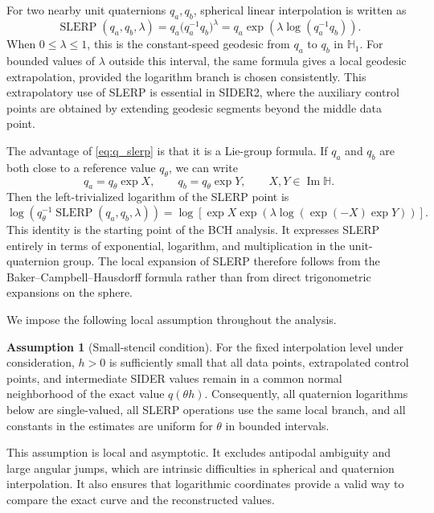 \documentclass[a4paper,11pt]{article}
\newcommand{\bH}{\mathbb{H}}
\newcommand{\SLERP}{\operatorname{SLERP}}
\newcommand{\ImH}{\operatorname{Im}\bH}
\numberwithin{equation}{section}
\theoremstyle{plain}
\theoremstyle{definition}
\newtheorem{assump}[thm]{Assumption}
\theoremstyle{remark}
\begin{document}
For two nearby unit quaternions \(q_a,q_b\), spherical linear interpolation is
written as
\begin{equation}
\label{eq:q_slerp}
        \SLERP(q_a,q_b,\lambda)
        =
        q_a\bigl(q_a^{-1}q_b\bigr)^\lambda
        =
        q_a\exp\!\left(\lambda\log(q_a^{-1}q_b)\right).
\end{equation}
When \(0\leq\lambda\leq1\), this is the constant-speed geodesic from \(q_a\)
to \(q_b\) in \(\bH_1\).  For bounded values of \(\lambda\) outside this
interval, the same formula gives a local geodesic extrapolation, provided the
logarithm branch is chosen consistently.  This extrapolatory use of SLERP is
essential in SIDER2, where the auxiliary control points are obtained by
extending geodesic segments beyond the middle data point.

The advantage of \eqref{eq:q_slerp} is that it is a Lie-group formula.  If
\(q_a\) and \(q_b\) are both close to a reference value \(q_\theta\), we can
write
\[
        q_a=q_\theta\exp X,
        \qquad
        q_b=q_\theta\exp Y,
        \qquad X,Y\in\ImH .
\]
Then the left-trivialized logarithm of the SLERP point is
\[
\log\!\left(
q_\theta^{-1}\SLERP(q_a,q_b,\lambda)
\right)
=
\log\!\left[
\exp X
\exp\!\left(
\lambda\log(\exp(-X)\exp Y)
\right)
\right].
\]
This identity is the starting point of the BCH analysis.  It expresses SLERP
entirely in terms of exponential, logarithm, and multiplication in the
unit-quaternion group.  The local expansion of SLERP therefore follows from
the Baker--Campbell--Hausdorff formula rather than from direct trigonometric
expansions on the sphere.

We impose the following local assumption throughout the analysis.

\begin{assump}[Small-stencil condition]
\label{assump:small_stencil_q}
For the fixed interpolation level under consideration, \(h>0\) is sufficiently
small that all data points, extrapolated control points, and intermediate
SIDER values remain in a common normal neighborhood of the exact value
\(q(\theta h)\).  Consequently, all quaternion logarithms below are
single-valued, all SLERP operations use the same local branch, and all
constants in the estimates are uniform for \(\theta\) in bounded intervals.
\end{assump}

This assumption is local and asymptotic.  It excludes antipodal ambiguity and
large angular jumps, which are intrinsic difficulties in spherical and
quaternion interpolation.  It also ensures that logarithmic coordinates provide
a valid way to compare the exact curve and the reconstructed values.
\end{document}
